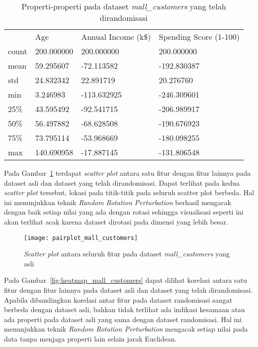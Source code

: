 \begin{table}
	\centering
	\caption{Properti-properti pada dataset \textit{mall\_customers} yang telah dirandomisasi}
	\begin{tabular}{l|lll}
		\hline
		& Age & Annual Income (k\$) & Spending Score (1-100) \\ 
 count& 200.000000 & 200.000000 & 200.000000 \\
 mean & 59.295607 & -72.113582 & -192.830387 \\
 std & 24.832342 & 22.891719 & 20.276760 \\
 min & 3.246983 & -113.632925 & -246.309601 \\
 25\% & 43.595492 & -92.541715 & -206.989917 \\
 50\% & 56.497882 & -68.628508 & -190.676923 \\
 75\% & 73.795114 & -53.968669 & -180.098255 \\
 max & 140.690958 & -17.887145 & -131.806548 \\
		\hline
	\end{tabular}
	\label{table:properti-mall-customers-randomisasi}
\end{table}

Pada Gambar~\ref{fig:pairplot_mall_customers} terdapat \textit{scatter plot} antara satu fitur dengan fitur lainnya pada dataset asli dan dataset yang telah dirandomisasi. Dapat terlihat pada kedua \textit{scatter plot} tersebut, lokasi pada titik-titik pada seluruh scatter plot berbeda. Hal ini menunjukkan teknik \textit{Random Rotation Perturbation} berhasil mengacak dengan baik setiap nilai yang ada dengan rotasi sehingga visualisasi seperti ini akan terlihat acak karena dataset dirotasi pada dimensi yang lebih besar.

\begin{figure}
	\centering
	\texttt{[image: pairplot\_mall\_customers]}
	\caption{\textit{Scatter plot} antara seluruh fitur pada dataset \textit{mall\_customers} yang asli}
	\label{fig:pairplot_mall_customers}
\end{figure}

Pada Gambar~\ref{fig:heatmap_mall_customers} dapat dilihat korelasi antara satu fitur dengan fitur lainnya pada dataset asli dan dataset yang telah dirandomisasi. Apabila dibandingkan korelasi antar fitur pada dataset randomisasi sangat berbeda dengan dataset asli, bahkan tidak terlihat ada indikasi kesamaan atau ada properti pada dataset asli yang sama dengan dataset randomisasi. Hal ini menunjukkan teknik \textit{Random Rotation Perturbation} mengacak setiap nilai pada data tanpa menjaga properti lain selain jarak Euclidean.

